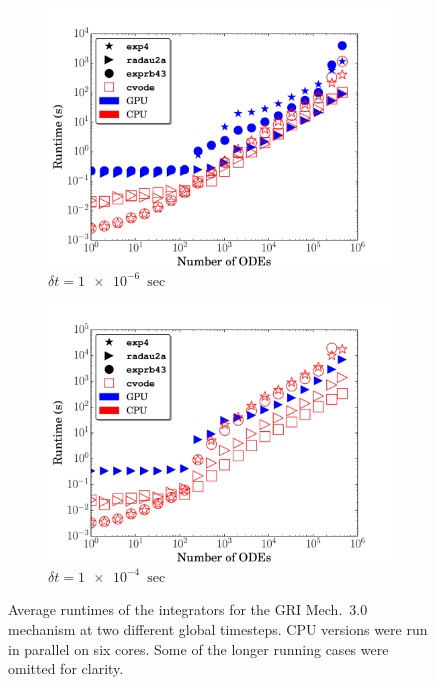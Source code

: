 \documentclass[preprint]{elsarticle}
\begin{document}
\begin{figure}[h]
  \centering
  \begin{subfigure}{0.49\textwidth}
      \includegraphics[width=\linewidth]{GRI_1e-06_cpuvsgpu.pdf}
      \caption{$\delta t = \SI{1e-6}{\sec}$}
  \end{subfigure}
  \begin{subfigure}{0.49\textwidth}
      \includegraphics[width=\linewidth]{GRI_1e-04_cpuvsgpu.pdf}
      \caption{$\delta t = \SI{1e-4}{\sec}$}
  \end{subfigure}
  \caption{Average runtimes of the integrators for the GRI Mech.~3.0 mechanism at two different global timesteps. 
  CPU versions were run in parallel on six cores.
  Some of the longer running cases were omitted for clarity.}
  \label{F:GRI_perf}
\end{figure}
\end{document}
